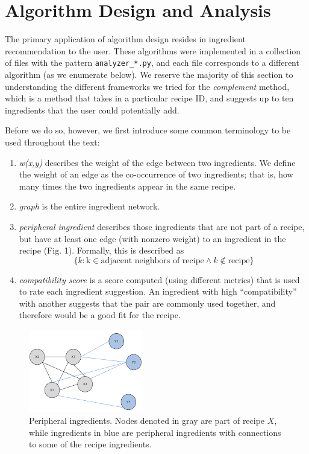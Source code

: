 \documentclass{acm_proc_article-sp}
\begin{document}
\section{Algorithm Design and Analysis}

The primary application of algorithm design resides in ingredient recommendation to the user. These algorithms were implemented in a collection of files with the pattern \texttt{analyzer\_*.py}, and each file corresponds to a different algorithm (as we enumerate below). We reserve the majority of this section to understanding the different frameworks we tried for the \textit{complement} method, which is a method that takes in a particular recipe ID, and suggests up to ten ingredients that the user could potentially add. 

Before we do so, however, we first introduce some common terminology to be used throughout the text:
\begin{enumerate}
	\item \textit{w(x,y)} describes the weight of the edge between two ingredients. We define the weight
	of an edge as the co-occurrence of two ingredients; that is, how many times the two ingredients 
	appear in the same recipe. 
	\item \textit{graph} is the entire ingredient network.
	\item \textit{peripheral ingredient} describes those ingredients that are not part of a recipe, but have at least one edge (with nonzero weight) to an ingredient in the recipe (Fig. 1). Formally, this is described as
	\[\{k : \text{k} \in \text{adjacent neighbors of recipe} \wedge k \notin \text{recipe}\}
	\]
	\item \textit{compatibility score} is a score computed (using different metrics) that
	is used to rate each ingredient suggestion. An ingredient with high ``compatibility''
	with another suggests that the pair are commonly used together, and therefore
	would be a good fit for the recipe.
\end{enumerate}


\begin{figure}[h]
	\centering
	\includegraphics[width=5cm]{peripheral}
	\caption{Peripheral ingredients. Nodes denoted in gray are part of recipe $X$, while ingredients in blue
	are peripheral ingredients with connections to some of the recipe ingredients.}
\end{figure}
\end{document}
